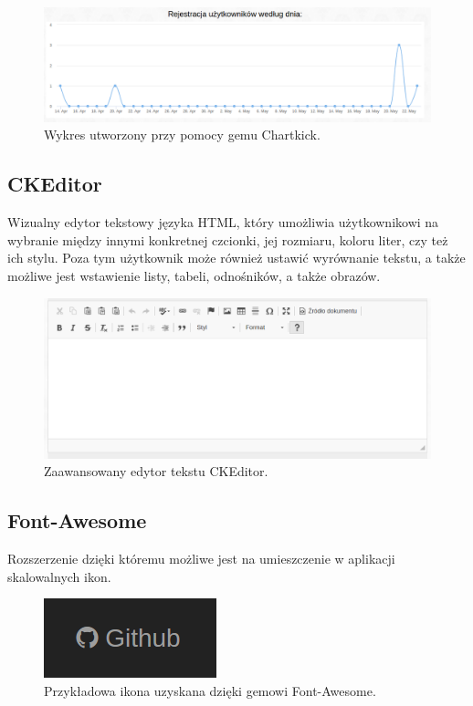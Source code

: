 \documentclass[brudnopis]{xmgr}
\begin{document}
\begin{figure}[!tbh]
\centering
\includegraphics[width=\linewidth]{fig/chart}
\caption{Wykres utworzony przy pomocy gemu Chartkick.}
\end{figure}

\subsection{CKEditor}

Wizualny edytor tekstowy języka HTML, który umożliwia użytkownikowi na wybranie między innymi konkretnej
czcionki, jej rozmiaru, koloru liter, czy też ich stylu. Poza tym użytkownik może również ustawić wyrównanie tekstu,
a także możliwe jest wstawienie listy, tabeli, odnośników, a także obrazów.

\begin{figure}[!tbh]
\centering
\includegraphics[width=\linewidth]{fig/ckeditor}
\caption{Zaawansowany edytor tekstu CKEditor.}
\end{figure}

\subsection{Font-Awesome}

Rozszerzenie dzięki któremu możliwe jest na umieszczenie w aplikacji skalowalnych ikon.

\begin{figure}[!tbh]
\centering
\includegraphics[scale=0.5]{fig/icon}
\caption{Przykładowa ikona uzyskana dzięki gemowi Font-Awesome.}
\end{figure}
\end{document}
